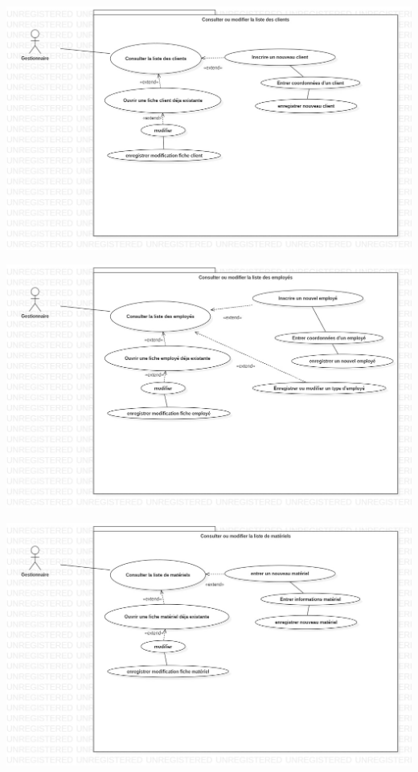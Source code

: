 \begin{center}
\includegraphics[scale=0.4]{use_case/consulterOuModifierListeClient.jpg} 
\end{center}

\begin{center}
\includegraphics[scale=0.4]{use_case/consulterOuModifierListeEmploye.jpg} 
\end{center}

\begin{center}
\includegraphics[scale=0.4]{use_case/consulterOuModifierListeMateriel.jpg} 
\end{center}

